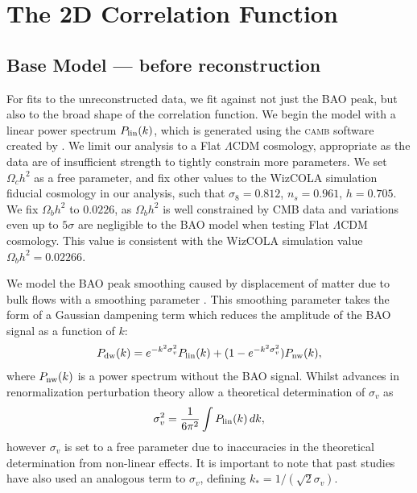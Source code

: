 \documentclass[a4paper,fleqn,usenatbib]{mnras}
\newcommand{\camb}{\textsc{camb}}
\begin{document}
\section{The 2D Correlation Function}
\label{sec:model}

\subsection{Base Model --- before reconstruction}
For fits to the unreconstructed data, we fit against not just the BAO peak, but also to the broad shape of the correlation function. We begin the model with a linear power spectrum $P_{\rm{lin}}(k)$, which is  generated using the \camb{} software created by \citet{Lewis2000}. We limit our analysis to a Flat $\Lambda$CDM cosmology, appropriate as the data are of insufficient strength to tightly constrain more parameters.
We set $\Omega_c h^2$ as a free parameter, and fix other values to the WizCOLA simulation fiducial cosmology in our analysis, such that $\sigma_8 = 0.812$, $n_s=0.961$, $h = 0.705$. We fix $\Omega_b h^2$ to $0.0226$, as $\Omega_b h^2$ is well constrained by CMB data and variations even up to $5\sigma$ are negligible to the BAO model when testing Flat $\Lambda$CDM cosmology. This value is consistent with the WizCOLA simulation value $\Omega_b h^2 = 0.02266$. 

We model the BAO peak smoothing caused by displacement of matter due to bulk flows with a smoothing parameter \citep{CrocceScoccimarro2008, SanchezBaughAngulo2008, Sanchez2009, BlakeDavis2011, BeutlerBlake2011}. This smoothing parameter takes the form of a Gaussian dampening term which reduces the amplitude of the BAO signal as a function of $k$:
\begin{align} \label{{eq:blake1}}
	P_{\rm{dw}}(k) = e^{-k^2 \sigma_v^2} P_{\rm{lin}}(k) + (1 - e^{-k^2 \sigma_v^2}) P_{\rm{nw}}(k),
\end{align}
where $P_{\rm{nw}}(k)$ is a power spectrum without the BAO signal. Whilst advances in renormalization perturbation theory  \citep[RPT;][]{CrocceScoccimarro2008} allow a theoretical determination of $\sigma_v$ as
\begin{align} \label{eq:sigmav}
\sigma_v^2 = \frac{1}{6\pi^2} \int P_{\rm{lin}}(k)\, dk,
\end{align}
however $\sigma_v$ is set to a free parameter due to inaccuracies in the theoretical determination from non-linear effects. It is important to note that past studies have also used an analogous term to $\sigma_v$, defining $k_* = 1/(\sqrt{2}\sigma_v)$.
\end{document}
